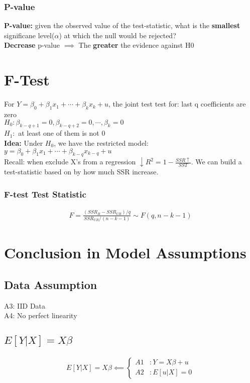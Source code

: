 \documentclass{article}
\theoremstyle{definition}
\theoremstyle{thrm}
\theoremstyle{lma}
\theoremstyle{ppst}
\theoremstyle{crlr}
\begin{document}
\subsubsection{P-value}
\textbf{P-value: }given the observed value of the test-statistic, what is the \textbf{smallest} significane level($\alpha$) at which the null would be rejected?\\
\textbf{Decrease} p-value $\implies$ The \textbf{greater} the evidence against H0

\section{F-Test}
For $Y = \beta_0 +\beta_1x_1+\cdots+\beta_kx_k+u$, the joint test test for: last q coefficients are zero\\
$H_0: \beta_{k-q+1} = 0, \beta_{k-q+2}=0,\cdots,\beta_k = 0$\\
$H_1: $ at least one of them is not 0\\
\textbf{Idea:} Under $H_0$, we have the restricted model: $y = \beta_0+\beta_1x_1+\cdots+\beta_{k-q}x_{k-q}+u$\\
Recall: when exclude X's from a regression $ \downarrow R^2 = 1-\frac{SSR\uparrow}{SST}$. We can build a test-statistic based on by how much SSR increase.\\
\subsubsection{F-test Test Statistic}
\begin{align*}
	F = \frac{(SSR_R - SSR_{UR})/q}{SSR_{UR}/(n-k-1)}\sim F(q,n-k-1)
\end{align*}

\section{Conclusion in Model Assumptions}
\subsection{Data Assumption}
A3: IID Data\\
A4: No perfect linearity

\subsection{$E[Y|X] = X\beta$}
\begin{align*}
E[Y|X] = X\beta \impliedby
\begin{cases}
		A1 &: Y=X\beta+u\\
		A2 &:E[u|X] = 0
\end{cases}
\end{align*}
\end{document}

